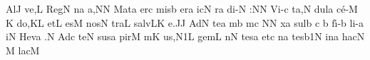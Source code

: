 
\smallskip

\Internote
\initiumgregorianum
{}%
\sgn {}Al\punctum J\egn
\sgn ve,\punctum L\egn
\spatium
\sgn Reg\punctum N\egn
\sgn {}{\'\i}n\punctum a\egn
\sgn {}a,\punctum N\augmentum N\egn
\spatium
\asteriscus
\sgn M{a}t\punctum a\egn
\sgn {}er\punctum c\egn
\spatium
\sgn mis\punctum b\egn
\sgn {}er\punctum a\egn
\sgn {}ic\punctum N\egn
{}r\punctum a\egn
\sgn di{-}\punctum N\egn
\sgn {}{\ae}:\punctum N\augmentum N\egn
\spatium
\divisiominor
\spatium
\sgn V{i}{-}\punctum c\egn
\sgn ta,\punctum N\egn
\spatium
\sgn dul\punctum a\egn
\sgn c{\'e}{-}\bivirga M\egn
\custos K
\lineaproxima
\sgn do,\punctum K\augmentum L\egn
\spatium
\divisiominor
\spatium
\sgn {}et\punctum L\egn
\spatium
{}es\punctum M\egn
\spatium
\sgn n{o}s\punctum N\egn
\sgn tra\punctum L\egn
\spatium
\sgn s{a}{lv}\clivis LK\egn
\sgn {}e.\punctum J\augmentum J\egn
\spatium
\divisiofinalis
\spatium
\sgn {}Ad\punctum N\egn
\spatium
\sgn te{}\punctum a\egn
\spatium
{}m\punctum b\egn
{}m\punctum c\egn
{}\punctum N\augmentum N\egn
\spatium
\divisiominor
\spatium
{}x\punctum a\egn
\sgn sul\punctum b\egn
{}\engl{}\punctum c\egn
\spatium
\custos b
\lineaproxima
\sgn f{\'\i}{-}\punctum b\egn
\sgn li{-}\punctum a\egn
\sgn {}i{}\punctum N\egn
\spatium
\sgn H{e}v\punctum a\egn
\sgn {}{\ae}.\punctum N\egn
\spatium
\divisiofinalis
\spatium
\sgn {}Ad\punctum c\egn
\spatium
\sgn te{}\punctum N\egn
\spatium
\sgn sus\punctum a\egn
\sgn pir\punctum M\egn
{}m\punctum K\egn
\sgn {}u{s,}\episem N1\punctum L\egn
\spatium
\divisiominor
\spatium
\sgn gem\punctum L\egn
{}n\punctum N\egn
\sgn tes\punctum a\egn
\spatium
\sgn {}et\punctum c\egn
\spatium
{}n\punctum a\egn
\sgn tes\episem b1\punctum N\egn
\spatium
\divisiominor
\spatium
\sgn {}in\punctum a\egn
\spatium
\sgn hac\engl{}\punctum N\egn
\spatium
\custos M\lineaproxima
\sgn lac\punctum M\egn
